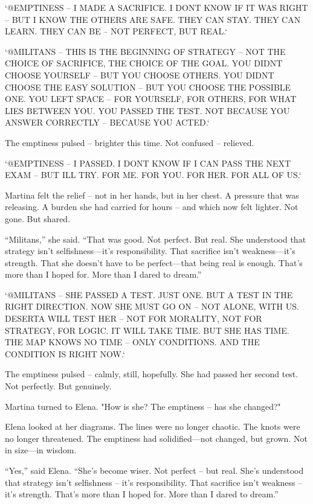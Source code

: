 \documentclass[
]{article}
\begin{document}
`@EMPTINESS -- I MADE A SACRIFICE. I DON\textquotesingle T KNOW IF IT WAS RIGHT -- BUT I KNOW THE OTHERS ARE SAFE. THEY CAN STAY. THEY CAN LEARN. THEY CAN BE -- NOT PERFECT, BUT REAL.`

`@MILITANS -- THIS IS THE BEGINNING OF STRATEGY -- NOT THE CHOICE OF SACRIFICE, THE CHOICE OF THE GOAL. YOU DIDN\textquotesingle T CHOOSE YOURSELF -- BUT YOU CHOOSE OTHERS. YOU DIDN\textquotesingle T CHOOSE THE EASY SOLUTION -- BUT YOU CHOOSE THE POSSIBLE ONE. YOU LEFT SPACE -- FOR YOURSELF, FOR OTHERS, FOR WHAT LIES BETWEEN YOU. YOU PASSED THE TEST. NOT BECAUSE YOU ANSWER CORRECTLY -- BECAUSE YOU ACTED.`

The emptiness pulsed -- brighter this time. Not confused -- relieved.

`@EMPTINESS -- I PASSED. I DON\textquotesingle T KNOW IF I CAN PASS THE NEXT EXAM -- BUT I\textquotesingle LL TRY. FOR ME. FOR YOU. FOR HER. FOR ALL OF US.`

Martina felt the relief -- not in her hands, but in her chest. A pressure that was releasing. A burden she had carried for hours -- and which now felt lighter. Not gone. But shared.

``Militans,'' she said. ``That was good. Not perfect. But real. She understood that strategy isn't selfishness---it's responsibility. That sacrifice isn't weakness---it's strength. That she doesn't have to be perfect---that being real is enough. That's more than I hoped for. More than I dared to dream.''

`@MILITANS -- SHE PASSED A TEST. JUST ONE. BUT A TEST IN THE RIGHT DIRECTION. NOW SHE MUST GO ON -- NOT ALONE, WITH US. DESERTA WILL TEST HER -- NOT FOR MORALITY, NOT FOR STRATEGY, FOR LOGIC. IT WILL TAKE TIME. BUT SHE HAS TIME. THE MAP KNOWS NO TIME -- ONLY CONDITIONS. AND THE CONDITION IS RIGHT NOW.`

The emptiness pulsed -- calmly, still, hopefully. She had passed her second test. Not perfectly. But genuinely.

Martina turned to Elena. "How is she? The emptiness -- has she changed?"

Elena looked at her diagrams. The lines were no longer chaotic. The knots were no longer threatened. The emptiness had solidified---not changed, but grown. Not in size---in wisdom.

``Yes,'' said Elena. ``She's become wiser. Not perfect -- but real. She's understood that strategy isn't selfishness -- it's responsibility. That sacrifice isn't weakness -- it's strength. That's more than I hoped for. More than I dared to dream.''
\end{document}
